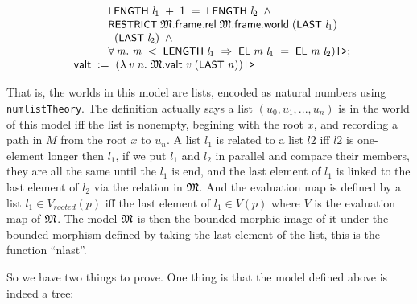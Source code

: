 \documentclass[letterpaper]{article}
\renewcommand{\HOLConst}[1]{{\textsf{\upshape\small #1}}}
\renewcommand{\HOLinline}[1]{\ensuremath{#1}}
\newenvironment{holmath}{\begin{displaymath}\begin{array}{l}}{\end{array}\end{displaymath}\ignorespacesafterend}
\begin{document}
\begin{holmath}
\;\;\;\;\;\;\;\;\;\;\;\;\;\HOLConst{LENGTH}\;\HOLBoundVar{l\sb{\mathrm{1}}}\;\HOLSymConst{\ensuremath{+}}\;\HOLNumLit{1}\;\HOLSymConst{=}\;\HOLConst{LENGTH}\;\HOLBoundVar{l\sb{\mathrm{2}}}\;\HOLSymConst{\HOLTokenConj{}}\\
\;\;\;\;\;\;\;\;\;\;\;\;\;\HOLConst{RESTRICT}\;\HOLFreeVar{\ensuremath{\mathfrak{M}}}.\HOLFieldName{frame}.\HOLFieldName{rel}\;\HOLFreeVar{\ensuremath{\mathfrak{M}}}.\HOLFieldName{frame}.\HOLFieldName{world}\;(\HOLConst{LAST}\;\HOLBoundVar{l\sb{\mathrm{1}}})\\
\;\;\;\;\;\;\;\;\;\;\;\;\;\;\;(\HOLConst{LAST}\;\HOLBoundVar{l\sb{\mathrm{2}}})\;\HOLSymConst{\HOLTokenConj{}}\\
\;\;\;\;\;\;\;\;\;\;\;\;\;\HOLSymConst{\HOLTokenForall{}}\HOLBoundVar{m}.\;\HOLBoundVar{m}\;\HOLSymConst{\HOLTokenLt{}}\;\HOLConst{LENGTH}\;\HOLBoundVar{l\sb{\mathrm{1}}}\;\HOLSymConst{\HOLTokenImp{}}\;\HOLConst{EL}\;\HOLBoundVar{m}\;\HOLBoundVar{l\sb{\mathrm{1}}}\;\HOLSymConst{=}\;\HOLConst{EL}\;\HOLBoundVar{m}\;\HOLBoundVar{l\sb{\mathrm{2}}})\HOLTokenRightrec{};\\
\;\;\HOLFieldName{valt}\;:=\;(\HOLTokenLambda{}\HOLBoundVar{v}\;\HOLBoundVar{n}.\;\HOLFreeVar{\ensuremath{\mathfrak{M}}}.\HOLFieldName{valt}\;\HOLBoundVar{v}\;(\HOLConst{LAST}\;\HOLBoundVar{n}))\HOLTokenRightrec{}
\end{holmath}

That is, the worlds in this model are lists, encoded as natural numbers using \texttt{numlistTheory}. The definition actually says a list $(u_0,u_1,...,u_n)$ is in the world of this model iff the list is nonempty, begining with the root $x$, and recording a path in $M$ from the root $x$ to $u_n$. A list $l_1$ is related to a list $l2$ iff $l2$ is one-element longer then $l_1$, if we put $l_1$ and $l_2$ in parallel and compare their members, they are all the same until the $l_1$ is end, and the last element of $l_1$ is linked to the last element of $l_2$ via the relation in \HOLinline{\HOLFreeVar{\ensuremath{\mathfrak{M}}}}. And the evaluation map is defined by a list $l_1\in V_{rooted}(p)$ iff the last element of $l_1\in V(p)$ where $V$ is the evaluation map of \HOLinline{\HOLFreeVar{\ensuremath{\mathfrak{M}}}}. The model \HOLinline{\HOLFreeVar{\ensuremath{\mathfrak{M}}}} is then the bounded morphic image of it under the bounded morphism defined by taking the last element of the list, this is the function ``nlast''.

So we have two things to prove. One thing is that the model defined above is indeed a tree:
\end{document}
